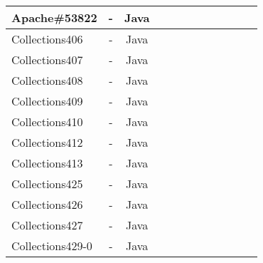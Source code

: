 \begin{table*}[h!]
\begin{tabular}{lccccccccccc}
    Apache\#53822     &  -  & Java  &  &              &    &                                 &                   &                           &                    &&            \\
    \midrule
    Collections406    &  -  & Java  &  &              &    &                                 &                   &                           &                    &&           \\
    Collections407    &  -  & Java  &  &              &    &                                 &                   &                           &                    &&          \\
    Collections408    &  -  & Java  &  &              &    &                                 &                   &                           &                    &&            \\
    Collections409    &  -  & Java  &  &              &    &                                 &                   &                           &                    &&            \\
    Collections410    &  - & Java  &  &              &    &                                 &                   &                           &                     &&           \\
    Collections412    &  -  & Java  &  &              &    &                                 &                   &                           &                    &&            \\
    Collections413    &  -  & Java  &  &              &    &                                 &                   &                           &                    &&            \\
    Collections425    &  -  & Java  &  &              &    &                                 &                   &                           &                    &&            \\
    Collections426    &  -  & Java  &  &              &    &                                 &                   &                           &                    &&            \\
    Collections427    &   - & Java  &  &              &    &                                 &                   &                           &                    &&            \\
    Collections429-0    &  -  & Java  &  &              &    &                                 &                   &                           &                  &&              \\

\end{tabular}
\end{table*}
